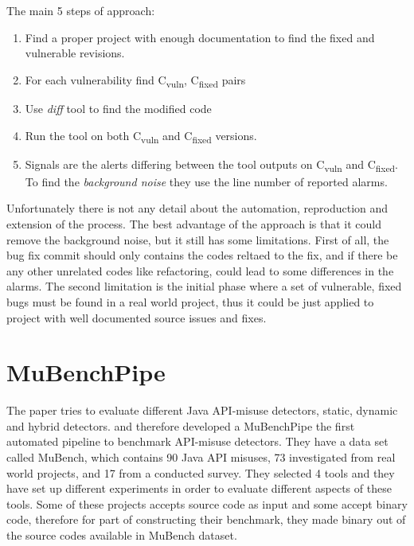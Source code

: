\documentclass[authoryear,preprint]{sigplanconf}
\begin{document}
The main 5 steps of approach: 
\begin{enumerate}
	\item Find a proper project with enough documentation to find the fixed and vulnerable revisions. 
	\item For each vulnerability find  C\textsubscript{vuln},  C\textsubscript{fixed} pairs
	\item Use \textit{diff} tool to find the modified code
	\item Run the tool on both C\textsubscript{vuln} and C\textsubscript{fixed} versions.
	\item Signals are the alerts differing between the tool outputs on C\textsubscript{vuln} and C\textsubscript{fixed}. To find the \textit{background noise} they use the line number of reported alarms. 
\end{enumerate}

Unfortunately there is not any detail about the automation, reproduction and extension of the process. The best advantage of the approach is that it could remove the background noise, but it still has some limitations. First of all, the bug fix commit should only contains the codes reltaed to the fix, and if there be any other unrelated codes like refactoring, could lead to some differences in the alarms. The second limitation is the initial phase where a set of vulnerable, fixed bugs must be found in a real world project, thus it could be just applied to project with well documented source issues and fixes.

\section{MuBenchPipe}
\label{sec:sec_mubenchpipe}

The paper tries to evaluate different Java API-misuse detectors, static, dynamic and hybrid detectors. and therefore developed a MuBenchPipe \cite{8338426} the first automated pipeline to benchmark API-misuse detectors. They have a data set called MuBench, which contains 90 Java API misuses, 73 investigated from real world projects, and 17 from a conducted survey. They
selected 4 tools and they have set up different experiments in order to evaluate different aspects of these tools. Some of these projects accepts source code as input and some accept binary code, therefore for part of constructing their benchmark, they made binary out of the source codes available in MuBench dataset.
\end{document}
